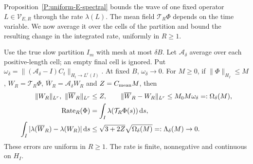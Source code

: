Proposition~\ref{P:uniform-E-spectral} bounds the wave of one fixed operator
$L \in \mathcal{V}_{E,R}$ through the rate $\lambda(L)$. The mean field
$\mathcal{T}_R\Phi$ depends on the time variable. We now average it over the
cells of the partition and bound the resulting change in the integrated rate,
uniformly in $R \ge 1$.

\begin{proposition}\label{P:uniform-rate-averaging}
  Use the true slow partition $I_m$ with mesh at most $\delta B$. Let
  $\mathcal{A}_\delta$ average over each positive-length cell; an empty final
  cell is ignored. Put $\omega_\delta = \|(\mathcal{A}_\delta-I)C_t\|_{H_t\to
  L^r(I)}$. At fixed $B$, $\omega_\delta \to 0$. For $M \ge 0$, if
  $\|\Phi\|_{H_I} \le M$, $W_R = \mathcal{T}_R\Phi$, $\overline{W}_R =
  \mathcal{A}_\delta W_R$ and $Z = C_{\rm mean}M$, then
  \begin{align}
    \|W_R\|_{L^r},\ \|\overline{W}_R\|_{L^r}&\le Z,\qquad
    \|\overline{W}_R-W_R\|_{L^r}\le M_0M\omega_\delta=:\Omega_\delta(M),
    \label{E:uniform-field-averaging}\\
    \operatorname{Rate}_R(\Phi)&=\int_I\lambda(\mathcal{T}_R\Phi(s))\,\mathrm{d} s,
    \label{E:uniform-mean-rate}\\
    \int_I|\lambda(\overline{W}_R)-\lambda(W_R)|\,\mathrm{d} s
    &\le\sqrt{3+2Z}\sqrt{\Omega_\delta(M)}=:\Lambda_\delta(M)\to0 .
    \label{E:uniform-rate-averaging}
  \end{align}
  These errors are uniform in $R \ge 1$. The rate is finite, nonnegative and
  continuous on $H_I$.
\end{proposition}

